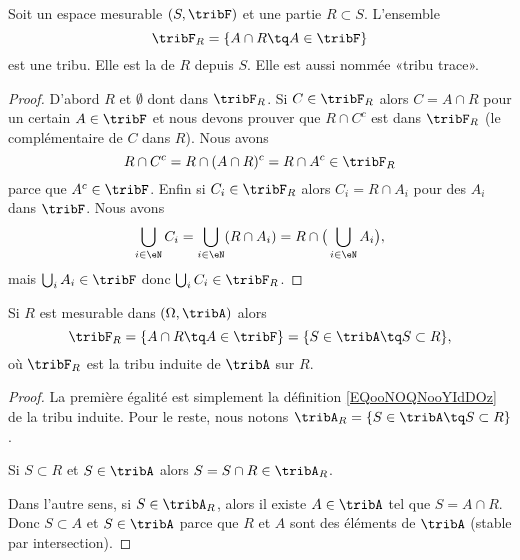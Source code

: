 \begin{propositionDef}      \label{DefDHTTooWNoKDP}
    Soit un espace mesurable \( (S,\tribF)  \) et une partie \( R\subset S\). L'ensemble
    \begin{equation}        \label{EQooNOQNooYIdDOz}
        \tribF_R=\{ A\cap R\tq A\in\tribF \}
    \end{equation}
    est une tribu. Elle est la  de \( R\) depuis \( S\). Elle est aussi nommée «tribu trace».
\end{propositionDef}

\begin{proof}
    D'abord \( R\) et \( \emptyset\) dont dans \( \tribF_R\). Si \( C\in\tribF_R \) alors \( C=A\cap R\) pour un certain \( A\in \tribF\) et nous devons prouver que \( R\cap C^c\) est dans \( \tribF_R\) (le complémentaire de \( C\) dans \( R\)). Nous avons
    \begin{equation}
        R\cap C^c=R\cap(A\cap R)^c=R\cap A^c\in \tribF_R
    \end{equation}
    parce que \( A^c\in \tribF\). Enfin si \( C_i\in \tribF_R\) alors \( C_i=R\cap A_i\) pour des \( A_i\) dans \( \tribF\). Nous avons
    \begin{equation}
        \bigcup_{i\in \eN}C_i=\bigcup_{i\in \eN}(R\cap A_i)=R\cap\big( \bigcup_{i\in \eN}A_i \big),
    \end{equation}
    mais \( \bigcup_iA_i \in \tribF\) donc \( \bigcup_iC_i\in \tribF_R\).
\end{proof}

\begin{proposition}     \label{PROPooUNNSooMUQKfp}
    Si \( R\) est mesurable dans \( (\Omega,\tribA)\) alors
    \begin{equation}
        \tribF_R=\{ A\cap R\tq A\in\tribF \}=\{ S\in\tribA\tq S\subset R \},
    \end{equation}
    où \( \tribF_R\) est la tribu induite de \( \tribA\) sur \( R\).
\end{proposition} 

\begin{proof}
    La première égalité est simplement la définition \eqref{EQooNOQNooYIdDOz} de la tribu induite. Pour le reste, nous notons \( \tribA_R=\{ S\in \tribA\tq S\subset R \}\).

    Si \( S\subset R\) et \( S\in \tribA\) alors \( S=S\cap R\in\tribA_R\).

    Dans l'autre sens, si \( S\in \tribA_R\), alors il existe \( A\in\tribA\) tel que \( S=A\cap R\). Donc \( S\subset A\) et \( S\in\tribA\) parce que \( R\) et \( A\) sont des éléments de \( \tribA\) (stable par intersection).
\end{proof}


